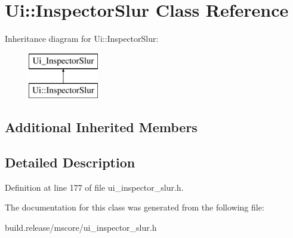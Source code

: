 \hypertarget{class_ui_1_1_inspector_slur}{}\section{Ui\+:\+:Inspector\+Slur Class Reference}
\label{class_ui_1_1_inspector_slur}
Inheritance diagram for Ui\+:\+:Inspector\+Slur\+:\begin{figure}[H]
\begin{center}
\leavevmode
\includegraphics[height=2.000000cm]{class_ui_1_1_inspector_slur}
\end{center}
\end{figure}
\subsection*{Additional Inherited Members}


\subsection{Detailed Description}


Definition at line 177 of file ui\+\_\+inspector\+\_\+slur.\+h.



The documentation for this class was generated from the following file\+:\begin{DoxyCompactItemize}
\item 
build.\+release/mscore/ui\+\_\+inspector\+\_\+slur.\+h\end{DoxyCompactItemize}
